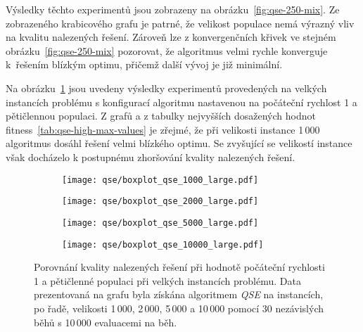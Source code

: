 Výsledky těchto experimentů jsou zobrazeny na obrázku~\ref{fig:qse-250-mix}. 
Ze zobrazeného krabicového grafu je patrné, že velikost populace nemá výrazný vliv na kvalitu nalezených řešení.
Zároveň lze z konvergenčních křivek ve stejném obrázku~\ref{fig:qse-250-mix} pozorovat, že algoritmus velmi rychle konverguje k~řešením blízkým optimu, přičemž další vývoj je již minimální. 

Na obrázku~\ref{fig:qse-large} jsou uvedeny výsledky experimentů provedených na velkých instancích problému s konfigurací algoritmu nastavenou na počáteční rychlost 1 a pětičlennou populaci.
Z grafů a z tabulky nejvyšších dosažených hodnot fitness~\ref{tab:qse-high-max-values} je zřejmé, že při velikosti instance 1\,000 algoritmus dosáhl řešení velmi blízkého optimu. Se zvyšující se velikostí instance však docházelo k postupnému zhoršování kvality nalezených řešení.

\begin{figure}[ht!]
    \centering
    \begin{subfigure}[b]{0.24\textwidth}
      \texttt{[image: qse/boxplot\_qse\_1000\_large.pdf]}
    \end{subfigure}
    \hfill
    \begin{subfigure}[b]{0.24\textwidth}
        \texttt{[image: qse/boxplot\_qse\_2000\_large.pdf]}
    \end{subfigure}
    \hfill
    \begin{subfigure}[b]{0.24\textwidth}
        \texttt{[image: qse/boxplot\_qse\_5000\_large.pdf]}
    \end{subfigure}
    \hfill
    \begin{subfigure}[b]{0.24\textwidth}
        \texttt{[image: qse/boxplot\_qse\_10000\_large.pdf]}
    \end{subfigure}
    \caption{Porovnání kvality nalezených řešení při hodnotě počáteční rychlosti 1 a pětičlenné populaci při velkých instancích problému. Data prezentovaná na grafu byla získána algoritmem \emph{QSE} na instancích, po řadě, velikosti 1\,000, 2\,000, 5\,000 a 10\,000 pomocí 30 nezávislých běhů s 10\,000 evaluacemi na běh.}
    \label{fig:qse-large}
\end{figure}

